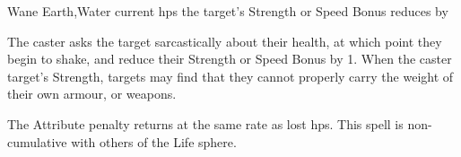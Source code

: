   {}%
  {Wane}%
  {Earth,Water}%
  {current \glspl{hp}}%
  {the target's Strength or Speed Bonus reduces by }%
  {
    The caster asks the target sarcastically about their health, at which point they begin to shake, and reduce their Strength or Speed Bonus by 1.
    When the caster target's Strength, targets may find that they cannot properly carry the weight of their own armour, or weapons.

    The Attribute penalty returns at the same rate as lost \glspl{hp}.
    This spell is non-cumulative with others of the Life sphere.
  }

